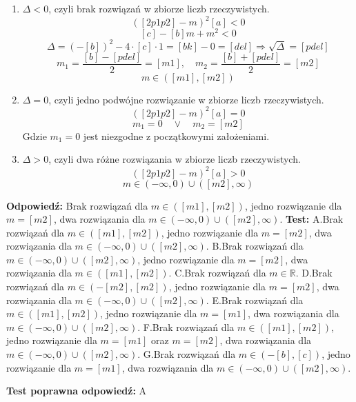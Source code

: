 \documentclass[12pt, a4paper]{article}
\theoremstyle{definition} %
\theoremstyle{definition} %
\newcommand{\rozwStop}{\newline}                                            %
\newcommand{\odpStart}{\noindent \textbf{Odpowiedź:}\newline}    %
\newcommand{\odpStop}{\newline}                                             %
\newcommand{\testStart}{\noindent \textbf{Test:}\newline} %
\newcommand{\testStop}{\newline} %
\newcommand{\kluczStart}{\noindent \textbf{Test poprawna odpowiedź:}\newline} %
\newcommand{\kluczStop}{\newline} %
\begin{document}
\begin{enumerate}
    \item $\Delta<0$, czyli brak rozwiązań w zbiorze liczb rzeczywistych.
    $$([2p1p2]-m)^{2}[a]<0$$
    $$[c]-[b]m+m^{2}<0$$
    $$\Delta=(-[b])^{2}-4\cdot[c]\cdot1=[bk]-0=
    [del] \Rightarrow \sqrt{\Delta}=[pdel]$$
    $$m_{1}=\frac{[b]-[pdel]}{2}=[m1], \quad m_{2}=\frac{[b]+[pdel]}{2}=[m2]$$
    $$m\in([m1],[m2])$$
    
    \item $\Delta=0$, czyli jedno podwójne rozwiązanie w zbiorze liczb rzeczywistych.
    $$([2p1p2]-m)^{2}[a]=0$$
    $$m_{1}=0  \quad \lor \quad m_{2}=[m2]$$
    Gdzie $m_{1}=0$ jest niezgodne z początkowymi założeniami.
    
    \item $\Delta>0$, czyli dwa różne rozwiązania w zbiorze liczb rzeczywistych.
    $$([2p1p2]-m)^{2}[a]>0$$
    $$m\in(-\infty,0)\cup([m2],\infty)$$
\end{enumerate}
\rozwStop
\odpStart
Brak rozwiązań dla $m\in([m1],[m2])$, jedno rozwiązanie dla $m=[m2]$, dwa rozwiązania dla $m\in(-\infty,0)\cup([m2],\infty)$.
\odpStop
\testStart
A.Brak rozwiązań dla $m\in([m1],[m2])$, jedno rozwiązanie dla $m=[m2]$, dwa rozwiązania dla $m\in(-\infty,0)\cup([m2],\infty)$.
B.Brak rozwiązań dla $m\in(-\infty,0)\cup([m2],\infty)$, jedno rozwiązanie dla $m=[m2]$, dwa rozwiązania dla $m\in([m1],[m2])$.
C.Brak rozwiązań dla $m\in\mathbb{R}$.
D.Brak rozwiązań dla $m\in(-[m2],[m2])$, jedno rozwiązanie dla $m=[m2]$, dwa rozwiązania dla $m\in(-\infty,0)\cup([m2],\infty)$.
E.Brak rozwiązań dla $m\in([m1],[m2])$, jedno rozwiązanie dla $m=[m1]$, dwa rozwiązania dla $m\in(-\infty,0)\cup([m2],\infty)$.
F.Brak rozwiązań dla $m\in([m1],[m2])$, jedno rozwiązanie dla $m=[m1]$ oraz  $m=[m2]$, dwa rozwiązania dla $m\in(-\infty,0)\cup([m2],\infty)$.
G.Brak rozwiązań dla $m\in(-[b],[c])$, jedno rozwiązanie dla $m=[m1]$, dwa rozwiązania dla $m\in(-\infty,0)\cup([m2],\infty)$.

\testStop
\kluczStart
A
\kluczStop
\end{document}
